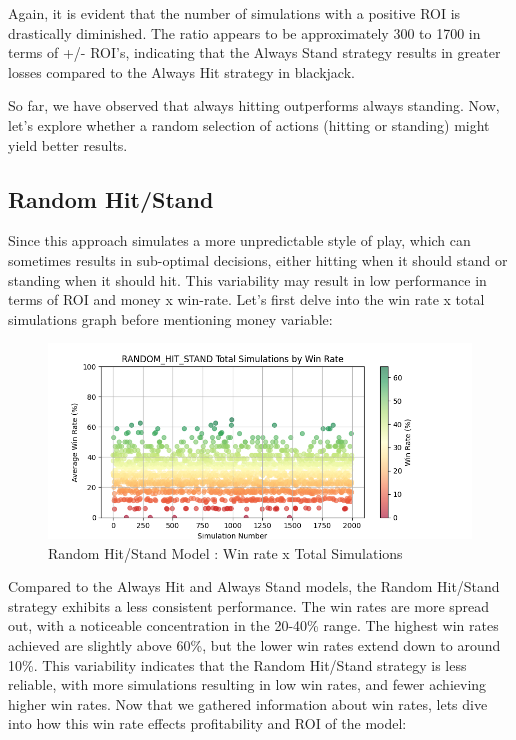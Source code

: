 \documentclass[a4paper,12pt]{report}
\begin{document}
Again, it is evident that the number of simulations with a positive ROI is drastically diminished. The ratio appears to be approximately 300 to 1700 in terms of +/- ROI's, indicating that the Always Stand strategy results in greater losses compared to the Always Hit strategy in blackjack.

So far, we have observed that always hitting outperforms always standing. Now, let's explore whether a random selection of actions (hitting or standing) might yield better results.

\subsection{Random Hit/Stand}
Since this approach simulates a more unpredictable style of play, which can sometimes  results in sub-optimal decisions, either hitting when it should stand or standing when it should hit. This variability may result in low performance in terms of ROI and money x win-rate. Let's first delve into the win rate x total simulations graph before mentioning money variable:

\begin{figure}[h]
\begin{center}
\includegraphics[scale=0.6]{figures/graphs/rhs_wr_ts.png}
\end{center}
\caption{Random Hit/Stand Model : Win rate x Total Simulations}
\label{fig:rhs_money_wr}
\end{figure}

Compared to the Always Hit and Always Stand models, the Random Hit/Stand strategy exhibits a less consistent performance. The win rates are more spread out, with a noticeable concentration in the 20-40\% range. The highest win rates achieved are slightly above 60\%, but the lower win rates extend down to around 10\%. This variability indicates that the Random Hit/Stand strategy is less reliable, with more simulations resulting in low win rates, and fewer achieving higher win rates. Now that we gathered information about win rates, lets dive into how this win rate effects profitability and ROI of the model:
\end{document}
